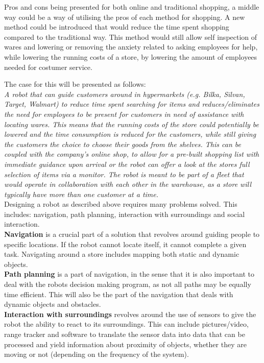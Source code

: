 Pros and cons being presented for both online and traditional shopping, a middle way could be a way of utilising the pros of each method for shopping. A new method could be introduced that would reduce the time spent shopping compared to the traditional way. This method would still allow self inspection of wares and lowering or removing the anxiety related to asking employees for help, while lowering the running costs of a store, by lowering the amount of employees needed for costumer service.

\newpage
The case for this will be presented as follows:\\

\textit{A robot that can guide customers around in hypermarkets (e.g. Bilka, Silvan, Target, Walmart) to reduce time spent searching for items and reduces/eliminates the need for employees to be present for customers in need of assistance with locating wares. This means that the running costs of the store could potentially be lowered and the time consumption is reduced for the customers, while still giving the customers the choice to choose their goods from the shelves. This can be coupled with the company's online shop, to allow for a pre-built shopping list with immediate guidance upon arrival or the robot can offer a look at the stores full selection of items via a monitor. The robot is meant to be part of a fleet that would operate in collaboration with each other in the warehouse, as a store will typically have more than one customer at a time.}\\

Designing a robot as described above requires many problems solved. This includes: navigation, path planning, interaction with surroundings and social interaction.\\

\textbf{Navigation} is a crucial part of a solution that revolves around guiding people to specific locations. If the robot cannot locate itself, it cannot complete a given task. Navigating around a store includes mapping both static and dynamic objects.\\

\textbf{Path planning} is a part of navigation, in the sense that it is also important to deal with the robots decision making program, as not all paths may be equally time efficient. This will also be the part of the navigation that deals with dynamic objects and obstacles.\\

\textbf{Interaction with surroundings} revolves around the use of sensors to give the robot the ability to react to its surroundings. This can include pictures/video, range tracker and software to translate the sensor data into data that can be processed and yield information about proximity of objects, whether they are moving or not (depending on the frequency of the system).\\

